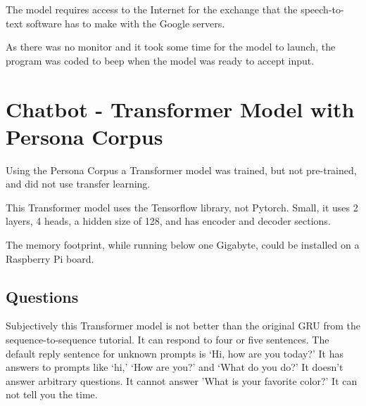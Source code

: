 The model requires access to the Internet for the exchange that the speech-to-text software has to make with the Google servers.%

As there was no monitor and it took some time for the model to launch, the program was coded to beep when the model was ready to accept input.

\section{Chatbot - Transformer Model with Persona Corpus}
Using the Persona Corpus a Transformer model was trained, but not pre-trained, and did not use transfer learning. %

This Transformer model uses the Tensorflow library, not Pytorch. Small, it uses 2 layers, 4 heads, a hidden size of 128, and has encoder and decoder sections.

The memory footprint, while running below one Gigabyte, could be installed on a Raspberry Pi board. %

\subsection{Questions}
Subjectively this Transformer model is not better than the original GRU from the sequence-to-sequence tutorial. It can respond to four or five sentences. 
The default reply sentence for unknown prompts is `Hi, how are you today?'
It has answers to prompts like `hi,' `How are you?' and `What do you do?' 
It doesn't answer arbitrary questions. It cannot answer 'What is your favorite color?' It can not tell you the time. 

